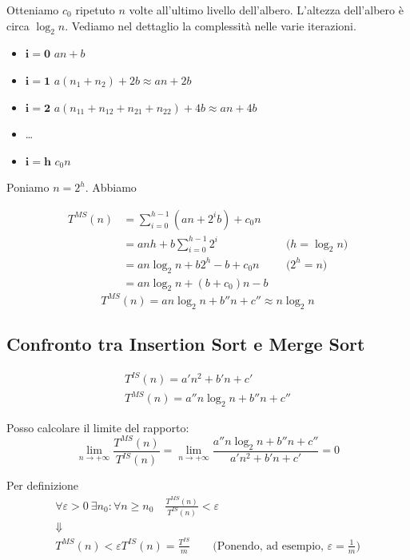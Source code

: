 Otteniamo $c_0$ ripetuto $n$ volte all'ultimo livello dell'albero. L'altezza dell'albero è circa 
$\log_2 n$. Vediamo nel dettaglio la complessità nelle varie iterazioni.
\begin{itemize}
	\item[] $\boldsymbol{i=0}$ \hspace{0.5cm} $an+b$
	\item[] $\boldsymbol{i=1}$ \hspace{0.5cm} $a(n_1+n_2)+2b \approx an+2b$
	\item[] $\boldsymbol{i=2}$ \hspace{0.5cm} $a(n_{11}+n_{12}+n_{21}+n_{22})+4b \approx an+4b$
	\item[] \dots
	\item[] $\boldsymbol{i=h}$ \hspace{0.5cm} $c_0n$
\end{itemize}

Poniamo $n=2^h$. Abbiamo

\begin{align*}
	T^{MS}(n) 	& = \displaystyle\sum_{i=0}^{h-1}(an+2^ib)+c_0n \\
				& = anh+b\displaystyle\sum_{i=0}^{h-1}2^i && \text{($h= \log_2n$)}\\
				& = an \log_2n + b2^h - b + c_0n && \text{($2^h=n$)} \\
				& = an \log_2n + (b+c_0)n - b
\end{align*}
\begin{displaymath}
	T^{MS}(n) = an \log_2n + b''n + c'' \approx n \log_2n
\end{displaymath}

\subsection{Confronto tra Insertion Sort e Merge Sort}

\begin{gather*}
	T^{IS}(n) = a'n^2 + b'n + c' \\
	T^{MS}(n) = a''n \log_2n + b''n + c''
\end{gather*}

Posso calcolare il limite del rapporto:
\begin{displaymath}
	\lim_{n \to +\infty} \frac{T^{MS}(n)}{T^{IS}(n)} = \lim_{n \to +\infty} \frac{a''n \log_2n + b''n + c''}{a'n^2 + b'n + c'} = 0
\end{displaymath}

Per definizione
\begin{gather*}
	\forall \varepsilon > 0 \ \exists n_0 : \forall n \geq n_0 \quad \frac{T^{MS}(n)}{T^{IS}(n)} < \varepsilon \\
	\Downarrow \\
	T^{MS}(n) < \varepsilon T^{IS}(n) = \frac{T^{IS}}{m} \qquad \text{(Ponendo, ad esempio, $\varepsilon = \frac{1}{m}$)}
\end{gather*}

